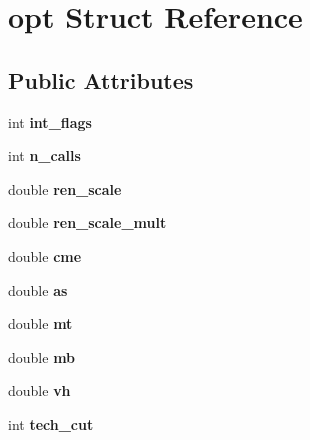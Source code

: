 \hypertarget{structopt}{}\section{opt Struct Reference}
\label{structopt}
\subsection*{Public Attributes}
\begin{DoxyCompactItemize}
\item 
\hypertarget{structopt_acc52d812132128f6088537b4e7e07be6}{}int {\bfseries int\+\_\+flags}\label{structopt_acc52d812132128f6088537b4e7e07be6}

\item 
\hypertarget{structopt_a6ddc969cea0f437ecea3bb299d14f69d}{}int {\bfseries n\+\_\+calls}\label{structopt_a6ddc969cea0f437ecea3bb299d14f69d}

\item 
\hypertarget{structopt_a076fcc87cf2c8ce62c9504c304015d45}{}double {\bfseries ren\+\_\+scale}\label{structopt_a076fcc87cf2c8ce62c9504c304015d45}

\item 
\hypertarget{structopt_ab7334c1859add22b3f27dfb7ab930a0d}{}double {\bfseries ren\+\_\+scale\+\_\+mult}\label{structopt_ab7334c1859add22b3f27dfb7ab930a0d}

\item 
\hypertarget{structopt_a8f98480b8d9fd189e551b50bf7b0e87d}{}double {\bfseries cme}\label{structopt_a8f98480b8d9fd189e551b50bf7b0e87d}

\item 
\hypertarget{structopt_ab61a87d5704d0c5ffde1ecdf99c58ec5}{}double {\bfseries as}\label{structopt_ab61a87d5704d0c5ffde1ecdf99c58ec5}

\item 
\hypertarget{structopt_a17c18467f0aef580d814ffa6b0836ab7}{}double {\bfseries mt}\label{structopt_a17c18467f0aef580d814ffa6b0836ab7}

\item 
\hypertarget{structopt_aafc6d245f706da1a6e3d28c01a48df40}{}double {\bfseries mb}\label{structopt_aafc6d245f706da1a6e3d28c01a48df40}

\item 
\hypertarget{structopt_a284de58961f7c639383a54335ab42bbe}{}double {\bfseries vh}\label{structopt_a284de58961f7c639383a54335ab42bbe}

\item 
\hypertarget{structopt_aced2f60b766a42008f9da934cef2f540}{}int {\bfseries tech\+\_\+cut}\label{structopt_aced2f60b766a42008f9da934cef2f540}


\end{DoxyCompactItemize}
